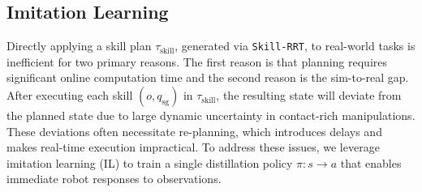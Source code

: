 \subsection{Imitation Learning}



Directly applying a skill plan \(\tau_{\text{skill}}\), generated via \texttt{Skill-RRT}, to real-world tasks is inefficient for two primary reasons. The first reason is that planning requires significant online computation time and the second reason is the sim-to-real gap. After executing each skill \((o, q_{\text{sg}})\) in \(\tau_{\text{skill}}\), the resulting state will deviate from the planned state due to large dynamic uncertainty in contact-rich manipulations. These deviations often necessitate re-planning, which introduces delays and makes real-time execution impractical. To address these issues, we leverage imitation learning (IL) to train a single distillation policy $\pi:s \rightarrow a$ that enables immediate robot responses to observations.


